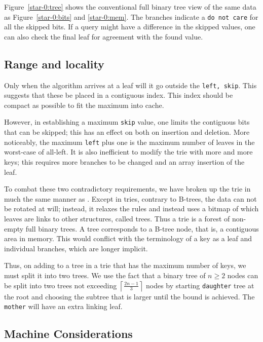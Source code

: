 \documentclass[12pt]{article}
\newcommand{\code}[1]{\colorbox{light-gray}{\texttt{#1}}}
\begin{document}
Figure~\ref{star-0:tree} shows the conventional full binary tree view of the same data as Figure~\ref{star-0:bits} and \ref{star-0:mem}. The branches indicate a \code{do not care} for all the skipped bits. If a query might have a difference in the skipped values, one can also check the final leaf for agreement with the found value.

\subsection{Range and locality}

Only when the algorithm arrives at a leaf will it go outside the \code{left, skip}. This suggests that these be placed in a contiguous index. This index should be compact as possible to fit the maximum into cache.

However, in establishing a maximum \code{skip} value, one limits the contiguous bits that can be skipped; this has an effect on both on insertion and deletion. More noticeably, the maximum \code{left} plus one is the maximum number of leaves in the worst-case of all-left. It is also inefficient to modify the trie with more and more keys; this requires more branches to be changed and an array insertion of the leaf.

To combat these two contradictory requirements, we have broken up the trie in much the same manner as \cite{bayer1972organization}. Except in tries, contrary to B-trees, the data can not be rotated at will; instead, it relaxes the rules and instead uses a bitmap of which leaves are links to other structures, called trees. Thus a trie is a forest of non-empty full binary trees. A tree corresponds to a B-tree node\cite{knuth1997sorting}, that is, a contiguous area in memory. This would conflict with the terminology of a key as a leaf and individual branches, which are longer implicit.

Thus, on adding to a tree in a trie that has the maximum number of keys, we must split it into two trees. We use the fact that a binary tree of $n \ge 2$ nodes can be split into two trees not exceeding $\left\lceil \frac{2n-1}{3} \right\rceil$ nodes by starting \code{daughter} tree at the root and choosing the subtree that is larger until the bound is achieved. The \code{mother} will have an extra linking leaf.

\subsection{Machine Considerations}
\end{document}
